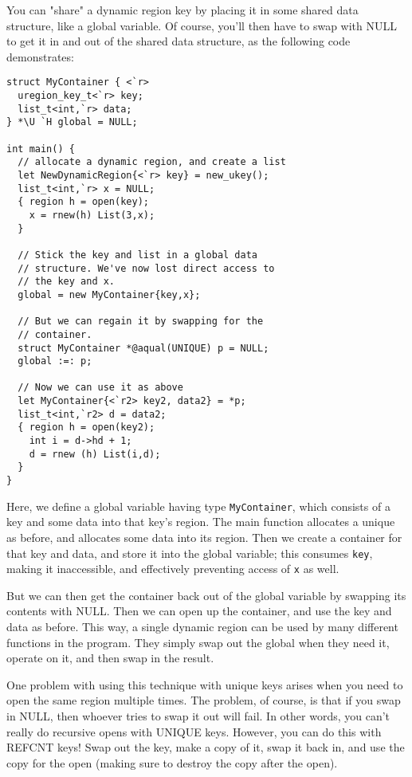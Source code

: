You can "share" a dynamic region key by placing it in some shared data
structure, like a global variable.  Of course, you'll then have to swap with
NULL to get it in and out of the shared data structure, as the following
code demonstrates:
\begin{verbatim}
struct MyContainer { <`r>
  uregion_key_t<`r> key;
  list_t<int,`r> data;
} *\U `H global = NULL;

int main() {
  // allocate a dynamic region, and create a list
  let NewDynamicRegion{<`r> key} = new_ukey();
  list_t<int,`r> x = NULL;
  { region h = open(key);
    x = rnew(h) List(3,x);
  }

  // Stick the key and list in a global data
  // structure. We've now lost direct access to
  // the key and x.
  global = new MyContainer{key,x};

  // But we can regain it by swapping for the
  // container.
  struct MyContainer *@aqual(UNIQUE) p = NULL;
  global :=: p;

  // Now we can use it as above
  let MyContainer{<`r2> key2, data2} = *p;
  list_t<int,`r2> d = data2;
  { region h = open(key2);
    int i = d->hd + 1;
    d = rnew (h) List(i,d);
  }
}
\end{verbatim}
Here, we define a global variable having type \texttt{MyContainer}, which
consists of a key and some data into that key's region.  The main function
allocates a unique as before, and allocates some data into its region.  Then
we create a container for that key and data, and store it into the global
variable; this consumes \texttt{key}, making it inaccessible, and
effectively preventing access of \texttt{x} as well.

But we can then get the container back out of the global variable by
swapping its contents with NULL.  Then we can open up the container, and use
the key and data as before.  This way, a single dynamic region can be used
by many different functions in the program.  They simply swap out the global
when they need it, operate on it, and then swap in the result.

One problem with using this technique with unique keys arises when you need
to open the same region multiple times.  The problem, of course, is that if
you swap in NULL, then whoever tries to swap it out will fail.  In other
words, you can't really do recursive opens with UNIQUE keys.  However, you can
do this with REFCNT keys!  Swap out the key, make a copy of it, swap it back
in, and use the copy for the open (making sure to destroy the copy after the
open).
  
